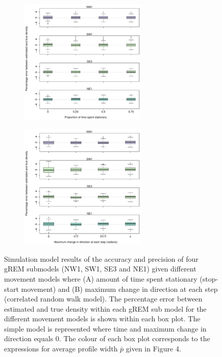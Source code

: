 \documentclass[a4paper,10pt,reqno,oneside]{amsart}
\begin{document}
\begin{figure}[t]
	\centering
	\begin{subfigure}[t]{60mm}
      		\centering
		\includegraphics[width=60mm]{imgs/ResultsPerch.pdf}
		\caption{} 
         	 \label{f:Perch}
	\end{subfigure}
	
	\begin{subfigure}[t]{60mm}
                \centering
		\includegraphics[width=60mm]{imgs/ResultsTort.pdf}
                \caption{} 
                \label{f:Tort}
         \end{subfigure}
	\label{f:BreakAssump}
	\caption{
	Simulation model results of the accuracy and precision of four gREM submodels (NW1, SW1, SE3 and NE1) given different movement models where (A) amount of time spent stationary (stop-start movement) and (B) maximum change in direction at each step (correlated random walk model). The percentage error between estimated and true density within each gREM sub model for the different movement models is shown within each box plot. The simple model is represented where time and maximum change in direction equals 0. The colour of each box plot corresponds to the expressions for average profile width $\bar{p}$ given in Figure 4.} 
\end{figure}

                  
                  
\end{document}
